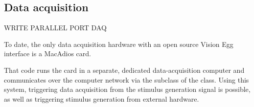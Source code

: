 \subsection{Data acquisition}

WRITE PARALLEL PORT DAQ

To date, the only data acquisition hardware with an open source Vision
Egg interface is a MacAdios card.  

That code runs the card in a separate, dedicated data-acquisition
computer and communicates over the computer network via the
 subclass of the  class. Using this
system, triggering data acquisition from the stimulus generation
signal is possible, as well as triggering stimulus generation from
external hardware.
